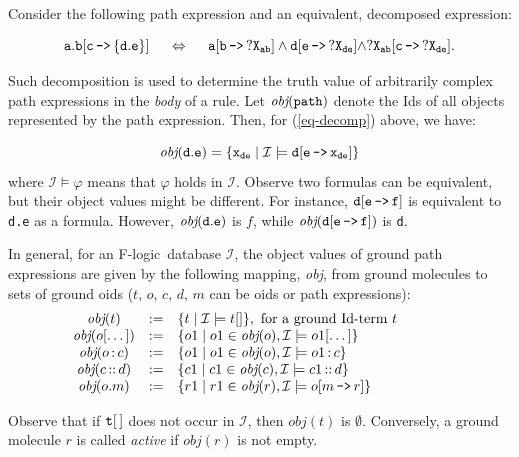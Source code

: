 \documentclass[11pt]{article}
\newcommand{\obj}{\textit{obj}\xspace}
\newcommand{\db}[1]{\ensuremath{\mathcal{#1}}}
\newcommand{\isa}{\,{\bf{:}}\,}
\newcommand{\subcl}{\,{\bf{::}}\,}
\newcommand{\mvd}{{\mbox{\tt \,->\,}}}  %
\newcommand{\fl}{\mbox{F-logic}\xspace}
\begin{document}
Consider the following path expression and an equivalent, decomposed
expression:

\begin{equation}\label{eq-decomp}
\tt
a.b[c\mvd\{d.e\}] \quad\ \Leftrightarrow \quad\  a[b\mvd ?X_{ab}]
\land d[e\mvd ?X_{de}] \land ?X_{ab}[c\mvd ?X_{de}]. 
\end{equation}

\noindent
Such decomposition is used to determine the truth value of arbitrarily complex
path expressions in the \emph{body} of a rule.  Let $\tt \obj(path)$ denote
the Ids of all objects represented by the path expression. Then, for
(\ref{eq-decomp}) above, we have:

\begin{displaymath} \tt
\obj(d.e) = \{x_{de} \mid \db I \models d[e\mvd 
x_{de}]\} 
\end{displaymath}
%
where $\db I \models \varphi$ means that $\varphi$ holds in \db I.  Observe
two formulas can be equivalent, but their object values might be different.
For instance, $\tt d[e\mvd f]$ is equivalent to {\tt d.e} as a formula.
However, $\tt \obj(d.e)$ is $f$, while $\tt \obj(d[e\mvd f])$ is {\tt d}.

In general, for an \fl\ database \db I, the object values of ground path
expressions are given by the following mapping, \obj, from ground molecules
to sets of ground oids ($t$, $o$, $c$, $d$, $m$ can be oids or path
expressions):
%
\begin{displaymath}
  \begin{array}{cll@{\hspace{4em}}c}
    \obj(t) & := & \{t \mid  \db I\models t[] \}, 
     \textrm{ for a ground Id-term $t$}  \\   
    \obj(o[\dots]) & := & \{o1 \mid o1\in\obj(o), \db I \models o1[\dots]
    \} \\  
    \obj(o\isa c) & := & \{o1 \mid o1\in\obj(o), \db I \models o1\isa c\}
     \\ 
    \obj(c\subcl d) & := & \{c1 \mid c1\in\obj(c), \db I \models c1\subcl
    d\} \\ 
    \obj(o.m) & :=  & \{r1 \mid r1\in\obj(r), \db I \models o[m\mvd
    r]\}  
  \end{array}
\end{displaymath}

Observe that if $\tt t[\,]$ does not occur in \db{I}, then $\obj(t)$ is
$\emptyset$.  Conversely, a ground molecule $r$ is called \emph{active} if
$\obj(r)$ is not empty.
\end{document}
